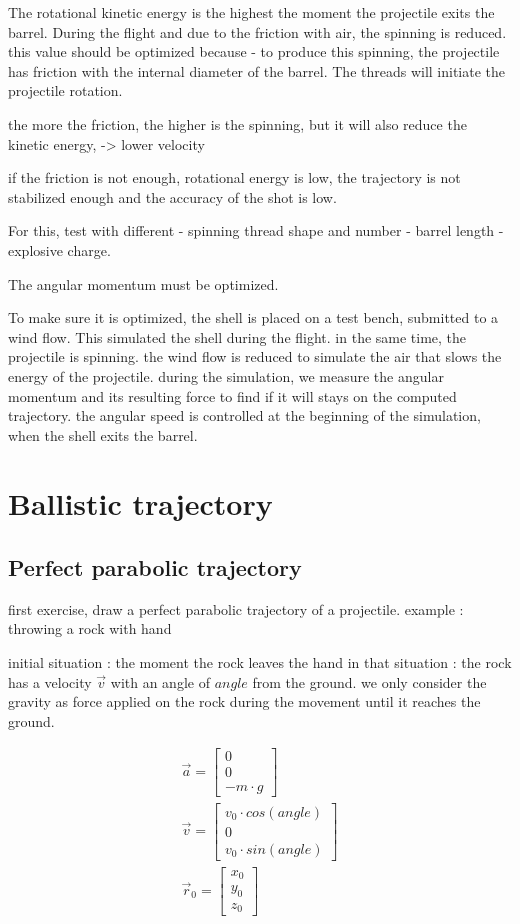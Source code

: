 \documentclass[12pt,a4paper]{article}
\begin{document}
The rotational kinetic energy is the highest the moment the projectile exits the barrel. During the flight and due to the friction with air, the spinning is reduced.
this value should be optimized because
- to produce this spinning, the projectile has friction with the internal diameter of the barrel. The threads will initiate the projectile rotation. 

the more the friction, the higher is the spinning, but it will also reduce the kinetic energy, -> lower velocity

if the friction is not enough, rotational energy is low, the trajectory is not stabilized enough and the accuracy of the shot is low. 

For this, test with different 
- spinning thread shape and number
- barrel length
- explosive charge. 

The angular momentum must be optimized.

To make sure it is optimized, the shell is placed on a test bench, submitted to a wind flow. This simulated the shell during the flight. in the same time, the projectile is spinning. 
the wind flow is reduced to simulate the air that slows the energy of the projectile. during the simulation, we measure the angular momentum and its resulting force to find if it will stays on the computed trajectory. 
the angular speed is controlled at the beginning of the simulation, when the shell exits the barrel. 

\newpage

\section{Ballistic trajectory}
\subsection{Perfect parabolic trajectory}
first exercise, draw a perfect parabolic trajectory of a projectile.
example : throwing a rock with hand

initial situation : the moment the rock leaves the hand 
in that situation : the rock has a velocity $\vec{v}$ with an angle of $angle$ from the ground. 
we only consider the gravity as force applied on the rock during the movement until it reaches the ground. 

\begin{eqnarray}
	\vec{a} = \begin{bmatrix}
		0 \\
		0\\
		- m \cdot g
	\end{bmatrix} \\
	\vec{v} = \begin{bmatrix}
		v_0 \cdot cos(angle) \\
		0\\
		v_0 \cdot sin(angle)
	\end{bmatrix} \\	
	\vec{r}_0 = \begin{bmatrix}
		x_0 \\
		y_0\\
		z_0
	\end{bmatrix} \\
\end{eqnarray}
\end{document}
